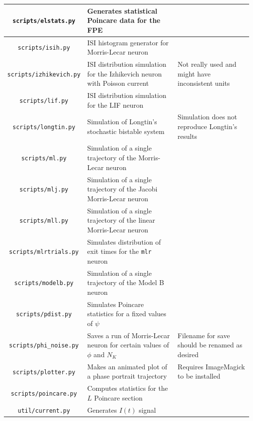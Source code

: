 \documentclass[letterpaper,12pt]{article}
\numberwithin{table}{section}
\numberwithin{figure}{section}
\numberwithin{equation}{section}
\begin{document}
\begin{flushleft}
\begin{center}
\begin{tabularx}{\linewidth}{ | c | Y | X | }
            \texttt{scripts/elstats.py} & Generates statistical Poincare data for the FPE & \\
            \hline
            \texttt{scripts/isih.py} & ISI histogram generator for Morris-Lecar neuron & \\
            \hline
            \texttt{scripts/izhikevich.py} & ISI distribution simulation for the Izhikevich neuron with Poisson current & Not really used and might have inconsistent units \\
            \hline
            \texttt{scripts/lif.py} & ISI distribution simulation for the LIF neuron & \\
            \hline
            \texttt{scripts/longtin.py} & Simulation of Longtin's stochastic bistable system & Simulation does not reproduce Longtin's results \\
            \hline
            \texttt{scripts/ml.py} & Simulation of a single trajectory of the Morris-Lecar neuron & \\
            \hline
            \texttt{scripts/mlj.py} & Simulation of a single trajectory of the Jacobi Morris-Lecar neuron & \\
            \hline
            \texttt{scripts/mll.py} & Simulation of a single trajectory of the linear Morris-Lecar neuron & \\
            \hline
            \texttt{scripts/mlrtrials.py} & Simulates distribution of exit times for the \texttt{mlr} neuron & \\
            \hline
            \texttt{scripts/modelb.py} & Simulation of a single trajectory of the Model B neuron & \\
            \hline
            \texttt{scripts/pdist.py} & Simulates Poincare statistics for a fixed values of $\psi$ & \\
            \hline
            \texttt{scripts/phi\_noise.py} & Saves a run of Morris-Lecar neuron for certain values of$\phi$ and $N_K$ & Filename for save should be renamed as desired \\
            \hline
            \texttt{scripts/plotter.py} & Makes an animated plot of a phase portrait trajectory & Requires ImageMagick to be installed \\
            \hline
            \texttt{scripts/poincare.py} & Computes statistics for the $L$ Poincare section & \\
            \hline
            \texttt{util/current.py} & Generates $I(t)$ signal & \\
            \hline

\end{tabularx}
\end{center}
\end{flushleft}
\end{document}
